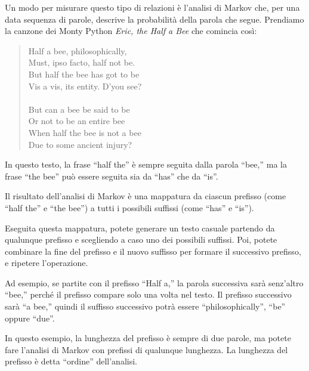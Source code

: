 \documentclass[10pt]{book}
\begin{document}
Un modo per misurare questo tipo di relazioni è l'analisi di Markov che, per una data sequenza di parole, descrive la probabilità della parola che segue. Prendiamo la canzone dei Monty Python {\em Eric, the Half a Bee} che comincia così:

\begin{quote}
Half a bee, philosophically, \\
Must, ipso facto, half not be. \\
But half the bee has got to be \\
Vis a vis, its entity. D'you see? \\
\\
But can a bee be said to be \\
Or not to be an entire bee \\
When half the bee is not a bee \\
Due to some ancient injury? \\
\end{quote}
%
In questo testo, la frase ``half the'' è sempre seguita dalla parola ``bee,''
ma la frase ``the bee'' può essere seguita sia da
``has'' che da ``is''.

Il risultato dell'analisi di Markov è una mappatura da ciascun prefisso
(come ``half the'' e ``the bee'') a tutti i possibili suffissi (come ``has'' e ``is'').

Eseguita questa mappatura, potete generare un testo casuale partendo da qualunque prefisso e scegliendo a caso uno dei possibili suffissi. Poi, potete combinare la fine del prefisso e il nuovo suffisso per formare il successivo prefisso, e ripetere l'operazione.

Ad esempio, se partite con il prefisso ``Half a,'' la parola successiva sarà senz'altro ``bee,'' perché il prefisso compare solo una volta nel testo. Il prefisso successivo sarà ``a bee,'' quindi il suffisso successivo potrà essere ``philosophically'', ``be'' oppure ``due''.

In questo esempio, la lunghezza del prefisso è sempre di due parole, ma potete fare l'analisi di Markov con prefissi di qualunque lunghezza. La lunghezza del prefisso è detta ``ordine'' dell'analisi.
\end{document}

